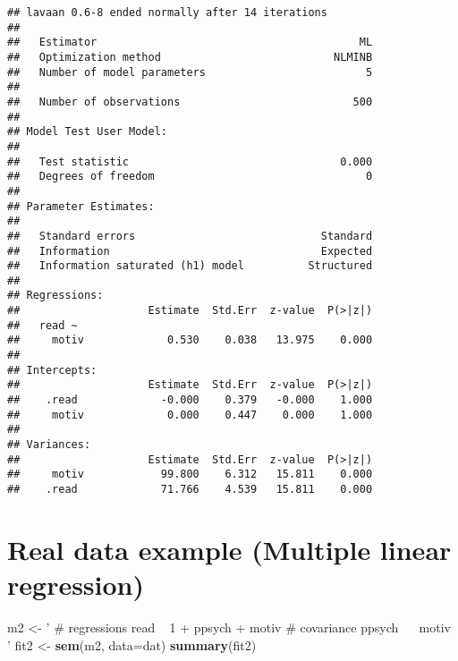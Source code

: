 \documentclass[]{book}
\newenvironment{Shaded}{\begin{snugshade}}{\end{snugshade}}
\newcommand{\DataTypeTok}[1]{\textcolor[rgb]{0.13,0.29,0.53}{#1}}
\newcommand{\KeywordTok}[1]{\textcolor[rgb]{0.13,0.29,0.53}{\textbf{#1}}}
\newcommand{\NormalTok}[1]{#1}
\newcommand{\StringTok}[1]{\textcolor[rgb]{0.31,0.60,0.02}{#1}}
\begin{document}
\begin{verbatim}
## lavaan 0.6-8 ended normally after 14 iterations
## 
##   Estimator                                         ML
##   Optimization method                           NLMINB
##   Number of model parameters                         5
##                                                       
##   Number of observations                           500
##                                                       
## Model Test User Model:
##                                                       
##   Test statistic                                 0.000
##   Degrees of freedom                                 0
## 
## Parameter Estimates:
## 
##   Standard errors                             Standard
##   Information                                 Expected
##   Information saturated (h1) model          Structured
## 
## Regressions:
##                    Estimate  Std.Err  z-value  P(>|z|)
##   read ~                                              
##     motiv             0.530    0.038   13.975    0.000
## 
## Intercepts:
##                    Estimate  Std.Err  z-value  P(>|z|)
##    .read             -0.000    0.379   -0.000    1.000
##     motiv             0.000    0.447    0.000    1.000
## 
## Variances:
##                    Estimate  Std.Err  z-value  P(>|z|)
##     motiv            99.800    6.312   15.811    0.000
##    .read             71.766    4.539   15.811    0.000
\end{verbatim}

\hypertarget{real-data-example-multiple-linear-regression}{%
\chapter{Real data example (Multiple linear regression)}\label{real-data-example-multiple-linear-regression}}

\begin{Shaded}
\begin{Highlighting}[]
\NormalTok{m2 <-}\StringTok{ '}
\StringTok{  # regressions}
\StringTok{    read ~ 1 + ppsych + motiv}
\StringTok{ # covariance}
\StringTok{    ppsych ~~ motiv}
\StringTok{'}
\NormalTok{fit2 <-}\StringTok{ }\KeywordTok{sem}\NormalTok{(m2, }\DataTypeTok{data=}\NormalTok{dat)}
\KeywordTok{summary}\NormalTok{(fit2)}
\end{Highlighting}
\end{Shaded}
\end{document}
